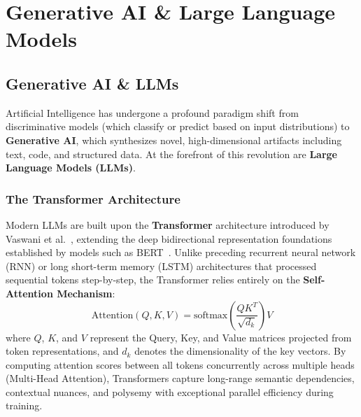 \section{Generative AI \& Large Language Models}
\label{sec:gen_ai}

\subsection{Generative AI \& LLMs}
\label{subsec:llm_foundations}

Artificial Intelligence has undergone a profound paradigm shift from discriminative models (which classify or predict based on input distributions) to \textbf{Generative AI}, which synthesizes novel, high-dimensional artifacts including text, code, and structured data. At the forefront of this revolution are \textbf{Large Language Models (LLMs)}.

\subsubsection{The Transformer Architecture}
Modern LLMs are built upon the \textbf{Transformer} architecture introduced by Vaswani et al.~\cite{vaswani2017attention}, extending the deep bidirectional representation foundations established by models such as BERT~\cite{devlin2019bert}. Unlike preceding recurrent neural network (RNN) or long short-term memory (LSTM) architectures that processed sequential tokens step-by-step, the Transformer relies entirely on the \textbf{Self-Attention Mechanism}:
\begin{equation}
    \text{Attention}(Q, K, V) = \text{softmax}\left(\frac{QK^T}{\sqrt{d_k}}\right)V
\end{equation}
\noindent where $Q$, $K$, and $V$ represent the Query, Key, and Value matrices projected from token representations, and $d_k$ denotes the dimensionality of the key vectors. By computing attention scores between all tokens concurrently across multiple heads (Multi-Head Attention), Transformers capture long-range semantic dependencies, contextual nuances, and polysemy with exceptional parallel efficiency during training.

